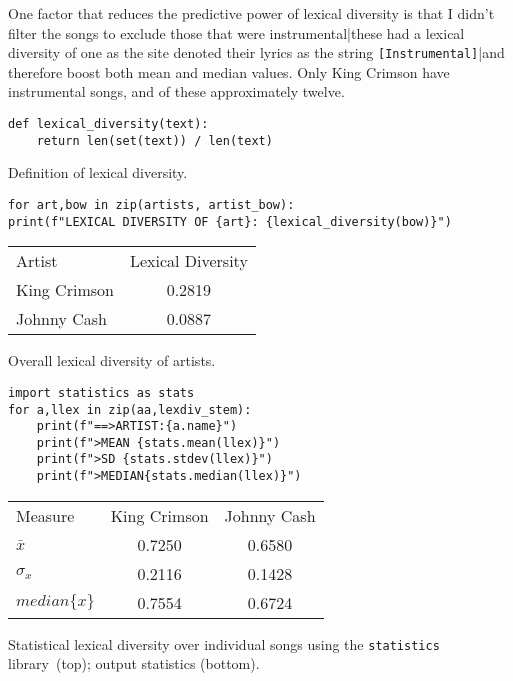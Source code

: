 One factor that reduces the predictive power of lexical diversity is that I didn't filter the songs to exclude those that were instrumental|these had a lexical diversity of one as the site denoted their lyrics as the string \texttt{[Instrumental]}|and therefore boost both mean and median values. Only King Crimson have instrumental songs, and of these approximately twelve.

\begin{listing}[h]
\begin{verbatim}
def lexical_diversity(text):
	return len(set(text)) / len(text)
\end{verbatim}
\caption{Definition of lexical diversity.}
\label{lst:lex div}
\end{listing}

\begin{listing}[h]
	\begin{verbatim}
for art,bow in zip(artists, artist_bow):
print(f"LEXICAL DIVERSITY OF {art}: {lexical_diversity(bow)}")
	\end{verbatim}
	\centering
	\begin{tabular}{lc}
		\toprule
		Artist&Lexical Diversity\\
		\cmidrule(r){1-1}\cmidrule(l){2-2}
		King Crimson&0.2819\\
		Johnny Cash&0.0887\\
		\bottomrule
	\end{tabular}
	\caption{Overall lexical diversity of artists.}
	\label{lst:lex div overall}
\end{listing}

\begin{listing}[h]
\begin{verbatim}
import statistics as stats
for a,llex in zip(aa,lexdiv_stem):
	print(f"==>ARTIST:{a.name}")
	print(f">MEAN {stats.mean(llex)}")
	print(f">SD {stats.stdev(llex)}")
	print(f">MEDIAN{stats.median(llex)}")
\end{verbatim}
	\centering
\begin{tabular}{lcc}
	\toprule
	Measure&King Crimson&Johnny Cash\\
	\cmidrule(r){1-1}\cmidrule(lr){2-2}\cmidrule(l){3-3}
	$\bar{x}$&0.7250&0.6580\\
	$\sigma_x$&0.2116&0.1428\\
	$median\{x\}$&0.7554&0.6724\\
	\bottomrule
\end{tabular}
\caption{Statistical lexical diversity over individual songs using the \texttt{statistics} library~(top); output statistics (bottom).}
\label{lst:songs lex div}
\end{listing}

